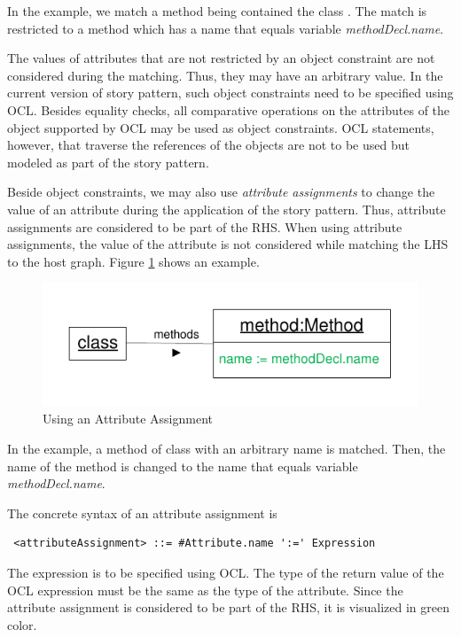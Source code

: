 In the example, we match a method being contained the class . The match is restricted to a method which has a name that equals variable \emph{methodDecl.name}.

The values of attributes that are not restricted by an object constraint are not considered during the matching. Thus, they may have an arbitrary value. In the current version of story pattern, such object constraints need to be specified using OCL. Besides equality checks, all comparative operations on the attributes of the object supported by OCL may be used as object constraints. OCL statements, however, that traverse the references of the objects are not to be used but modeled as part of the story pattern.

Beside object constraints, we may also use \emph{attribute assignments} to change the value of an attribute during the application of the story pattern. Thus, attribute assignments are considered to be part of the RHS. When using attribute assignments, the value of the attribute is not considered while matching the LHS to the host graph. Figure \ref{fig:attributeAssignment} shows an example.

\begin{figure}[htbp]
  \centering
  \includegraphics[scale=1]{figures/AttributeAssignment}
  \caption{Using an Attribute Assignment}
  \label{fig:attributeAssignment}
\end{figure}

In the example, a method of class  with an arbitrary name is matched. Then, the name of the method is changed to the name that equals variable \emph{methodDecl.name}. 

The concrete syntax of an attribute assignment is
\begin{lstlisting}
 <attributeAssignment> ::= #Attribute.name ':=' Expression
\end{lstlisting}
The expression is to be specified using OCL. The type of the return value of the OCL expression must be the same as the type of the attribute. Since the attribute assignment is considered to be part of the RHS, it is visualized in green color.

